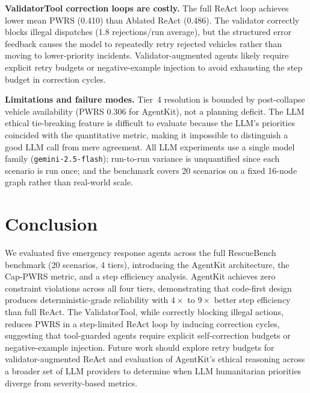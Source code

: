 \documentclass{article}
\begin{document}
\vspace{0.25em}
\textbf{ValidatorTool correction loops are costly.}
The full ReAct loop achieves lower mean PWRS (0.410) than Ablated ReAct
(0.486). The validator correctly blocks illegal dispatches (1.8 rejections/run
average), but the structured error feedback causes the model to repeatedly
retry rejected vehicles rather than moving to lower-priority incidents.
Validator-augmented agents likely require explicit retry budgets or
negative-example injection to avoid exhausting the step budget in correction
cycles.

\vspace{0.25em}
\textbf{Limitations and failure modes.}
Tier~4 resolution is bounded by post-collapse vehicle availability (PWRS
0.306 for AgentKit), not a planning deficit. The LLM
ethical tie-breaking feature is difficult to evaluate because the LLM's
priorities coincided with the quantitative metric, making it impossible to
distinguish a good LLM call from mere agreement. All LLM experiments use a
single model family (\texttt{gemini-2.5-flash}); run-to-run variance is
unquantified since each scenario is run once; and the benchmark covers 20
scenarios on a fixed 16-node graph rather than real-world scale.

\section{Conclusion}
\label{sec:conclusion}

We evaluated five emergency response agents across the full RescueBench
benchmark (20 scenarios, 4 tiers), introducing the AgentKit architecture, the
Cap-PWRS metric, and a step efficiency analysis. AgentKit achieves zero constraint violations across all four tiers,
demonstrating that code-first design produces deterministic-grade reliability
with $4\times$ to $9\times$ better step efficiency than full ReAct. The
ValidatorTool, while correctly blocking illegal actions, reduces PWRS in a
step-limited ReAct loop by inducing correction cycles, suggesting that
tool-guarded agents require explicit self-correction budgets or
negative-example injection. Future work should explore retry budgets for
validator-augmented ReAct and evaluation of AgentKit's ethical reasoning
across a broader set of LLM providers to determine when LLM humanitarian
priorities diverge from severity-based metrics.
\end{document}
